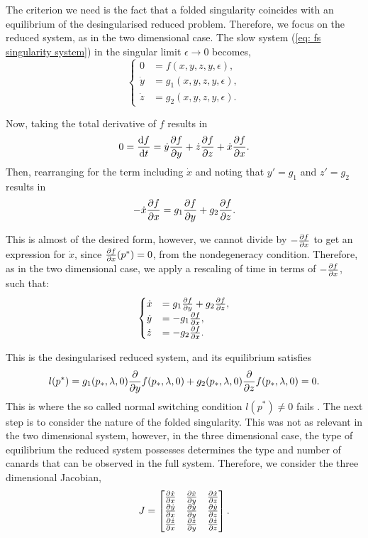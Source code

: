 The criterion we need is the fact that a folded singularity coincides with an equilibrium of the desingularised reduced problem. Therefore, we focus on the reduced system, as in the two dimensional case. The slow system (\ref{eq: fs singularity system}) in the singular limit $\epsilon \to 0$ becomes,
\begin{equation}
\begin{cases}
0 &=f(x,y,z,y,\epsilon),\\
\dot{y}&=g_1(x,y,z,y,\epsilon),\\
\dot{z}&=g_2(x,y,z,y,\epsilon).
\end{cases}\label{eq: fs singularity systemeps0}
\end{equation}

Now, taking the total derivative of $f$ results in
\begin{align*}
0 = \od{f}{t} =\dot{y}\pd{f}{y}+\dot{z}\pd{f}{z} + \dot{x}\pd{f}{x}.
\end{align*}
Then, rearranging for the term including $\dot{x}$ and noting that $ y'=g_1 $ and $ z'=g_2 $ results in
\begin{align*}
-\dot{x}\pd{f}{x} = g_1 \pd{f}{y}+ g_2\pd{f}{z}.
\end{align*}

This is almost of the desired form, however, we cannot divide by $-\pd{f}{x}$ to get an expression for $\dot{x}$, since $\pd{f}{x}(p^*)=0$, from the nondegeneracy condition.
Therefore, as in the two dimensional case, we apply a rescaling of time in terms of $-\pd{f}{x}$, such that:
\begin{equation} \label{somegenericthreedim}
\begin{cases}
\dot{x}&=g_1\pd{f}{y}+g_2\pd{f}{z},\\
\dot{y}&=-g_1\pd{f}{x},\\
\dot{z}&=-g_2\pd{f}{x}.
\end{cases}
\end{equation}

This is the desingularised reduced system, and its equilibrium satisfies
\begin{align*}
l(p^*)= g_1(p_*,\lambda,0)\pd{}{y}f(p_*,\lambda,0)+g_2(p_*,\lambda,0)\pd{}{z}f(p_*,\lambda,0)=0.
\end{align*}
This is where the so called normal switching condition $l(p^*) \neq 0$ fails \citep{Kuehn}.
The next step is to consider the nature of the folded singularity. This was not as relevant in the two dimensional system, however, in the three dimensional case, the type of equilibrium the reduced system possesses determines the type and number of canards that can be observed in the full system.
Therefore, we consider the three dimensional Jacobian,
\begin{equation}
J=\begin{bmatrix}
\pd{\dot{x}}{x}&\pd{\dot{x}}{y}&\pd{\dot{x}}{z}\\
\pd{\dot{y}}{x}&\pd{\dot{y}}{y}&\pd{\dot{y}}{z}\\
\pd{\dot{z}}{x}&\pd{\dot{z}}{y}&\pd{\dot{z}}{z}\\
\end{bmatrix}.
\end{equation}

